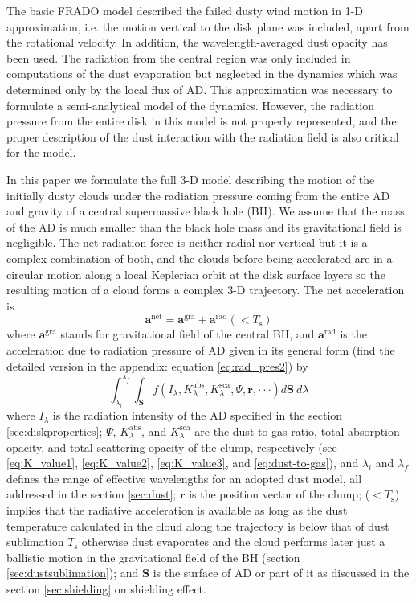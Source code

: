 \documentclass[twocolumn]{aastex62}
\begin{document}
The basic FRADO model \citep{Czerny2011, Czerny2015, Czerny2016, Czerny2017} described the failed dusty wind motion in 1-D approximation, i.e. the motion vertical to the disk plane was included, apart from the rotational velocity. In addition, the wavelength-averaged dust opacity has been used. The radiation from the central region was only included in computations of the dust evaporation but neglected in the dynamics which was determined only by the local flux of AD. This approximation was necessary to formulate a semi-analytical model of the dynamics. However, the radiation pressure from the entire disk in this model is not properly represented, and the proper description of the dust interaction with the radiation field is also critical for the model.

In this paper we formulate the full 3-D model describing the motion of the initially dusty clouds under the radiation pressure coming from the entire AD and gravity of a central supermassive black hole (BH). We assume that the mass of the AD is much smaller than the black hole mass and its gravitational field is negligible. The net radiation force is neither radial nor vertical but it is a complex combination of both, and the clouds before being accelerated are in a circular motion along a local Keplerian orbit at the disk surface layers so the resulting motion of a cloud forms a complex 3-D trajectory. The net acceleration is
\begin{equation}
\textbf{a}^{\mathrm{net}} =
\textbf{a}^{\mathrm{gra}} +
\textbf{a}^{\mathrm{rad}}(<T_{\mathrm{s}})
\end{equation}
where $\textbf{a}^{\mathrm{gra}}$ stands for gravitational field of the central BH, and $\textbf{a}^{\mathrm{rad}}$ is the acceleration due to radiation pressure of AD given in its general form (find the detailed version in the appendix: equation \ref{eq:rad_pres2}) by
\begin{equation}
\int_{\lambda_{i}}^{\lambda_{f}}
\int_{\textbf{S}}
f \left(
I_{\lambda}, K^{\mathrm{abs}}_{\lambda},
K^{\mathrm{sca}}_{\lambda}, \Psi, \textbf{r}, \cdot\cdot\cdot
\right) d\textbf{S}\ d\lambda
\end{equation}
where
$I_{\lambda}$ is the radiation intensity of the AD specified in the section \ref{sec:diskproperties};
$\Psi$, $K^{\mathrm{abs}}_{\lambda}$, and $K^{\mathrm{sca}}_{\lambda}$ are the dust-to-gas ratio, total absorption opacity, and total scattering opacity of the clump, respectively (see \ref{eq:K_value1}, \ref{eq:K_value2}, \ref{eq:K_value3}, and \ref{eq:dust-to-gas}), and $\lambda_{i}$ and $\lambda_{f}$ defines the range of effective wavelengths for an adopted dust model, all addressed in the section \ref{sec:dust}; $\textbf{r}$ is the position vector of the clump;
($<T_{\mathrm{s}}$) implies that the radiative acceleration is available as long as the dust temperature calculated in the cloud along the trajectory is below that of dust sublimation $T_{\mathrm{s}}$ otherwise dust evaporates and the cloud performs later just a ballistic motion in the gravitational field of the BH (section \ref{sec:dustsublimation});
and $\textbf{S}$ is the surface of AD or part of it as discussed in the section \ref{sec:shielding} on shielding effect.
\end{document}
